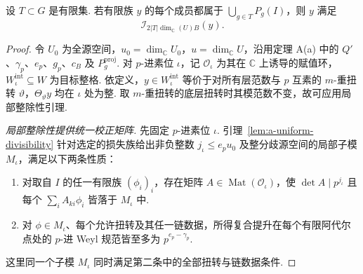 \begin{theorem}[A(b)：归一化像族的局部格指数上界]
\label{thm:index-bound}
\emitthmsource
设 $T\subset G$ 是有限集. 若有限族 $y$ 的每个成员都属于 $\bigcup_{g\in T}P_g(I)$，则 $y$ 满足
\begin{equation}
  \mathcal I_{2|T|\dim_{\mathbb C}(U)B}(y).
\label{eq:a-index}
\end{equation}
\end{theorem}
\begin{proof}
令 $U_0$ 为全源空间，$u_0=\dim_{\mathbb C}U_0$，$u=\dim_{\mathbb C}U$，沿用定理 A(a) 中的 $Q'$、$\gamma_p$、$e_p$、$g_p$、$c_B$ 及 $P_g^{\mathrm{proj}}$. 对 $p$-进素位 $\iota$，记 $\mathcal O_\iota$ 为其在 $\mathbb C$ 上诱导的赋值环，$W_{\iota}^{\mathrm{int}}\subseteq W$ 为目标整格. 依定义，$y\in W_{\iota}^{\mathrm{int}}$ 等价于对所有层范数与 $p$ 互素的 $m$-重扭转 $\vartheta$，$\Theta_\vartheta y$ 均在 $\iota$ 处为整. 取 $m$-重扭转的底层扭转时其模范数不变，故可应用局部整除性引理.

\emph{局部整除性提供统一校正矩阵.}
先固定 $p$-进素位 $\iota$. 引理~\ref{lem:a-uniform-divisibility} 针对选定的损失族给出非负整数 $j_\iota\le e_pu_0$ 及整分歧源空间的局部子模 $M_\iota$，满足以下两条性质：
\begin{enumerate}
\item 对取自 $I$ 的任一有限族 $(\phi_i)_i$，存在矩阵 $A\in\operatorname{Mat}(\mathcal O_\iota)$，使
$\det A\mid p^{j_\iota}$ 且每个 $\sum_i A_{ki}\phi_i$ 皆落于 $M_\iota$ 中.
\item 对 $\phi\in M_\iota$、每个允许扭转及其任一链数据，所得复合提升在每个有限阿代尔点处的 $p$-进 Weyl 规范皆至多为 $p^{e_p-\gamma_p}$.
\end{enumerate}
这里同一个子模 $M_\iota$ 同时满足第二条中的全部扭转与链数据条件.


\end{proof}
